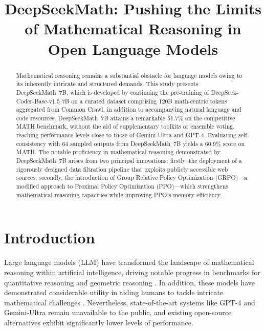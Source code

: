 \title{DeepSeekMath: Pushing the Limits of Mathematical Reasoning in Open Language Models}

\begin{abstract}
Mathematical reasoning remains a substantial obstacle for language models owing to its inherently intricate and structured demands. This study presents DeepSeekMath~7B, which is developed by continuing the pre-training of DeepSeek-Coder-Base-v1.5 7B on a curated dataset comprising 120B math-centric tokens aggregated from Common Crawl, in addition to accompanying natural language and code resources. DeepSeekMath~7B attains a remarkable 51.7\% on the competitive MATH benchmark, without the aid of supplementary toolkits or ensemble voting, reaching performance levels close to those of Gemini-Ultra and GPT-4. Evaluating self-consistency with 64 sampled outputs from DeepSeekMath~7B yields a 60.9\% score on MATH. The notable proficiency in mathematical reasoning demonstrated by DeepSeekMath~7B arises from two principal innovations: firstly, the deployment of a rigorously designed data filtration pipeline that exploits publicly accessible web sources; secondly, the introduction of Group Relative Policy Optimization (GRPO)—a modified approach to Proximal Policy Optimization (PPO)—which strengthens mathematical reasoning capacities while improving PPO's memory efficiency.
\end{abstract}

\section{Introduction}

Large language models (LLM) have transformed the landscape of mathematical reasoning within artificial intelligence, driving notable progress in benchmarks for quantitative reasoning \citep{MATH} and geometric reasoning \citep{trinh2024solving}. In addition, these models have demonstrated considerable utility in aiding humans to tackle intricate mathematical challenges \citep{tao}. Nevertheless, state-of-the-art systems like GPT-4 \citep{gpt4} and Gemini-Ultra \citep{gemini} remain unavailable to the public, and existing open-source alternatives exhibit significantly lower levels of performance.

